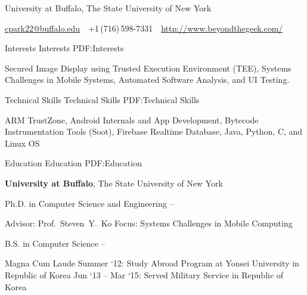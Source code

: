 \documentclass[letterpaper,MMMyyyy,nonstopmode]{simpleresumecv}
\newcommand{\CVAuthor}{Chang Min Park}
\newcommand{\CVWebpage}{http://www.beyondthegeek.com/}
\begin{document}

\Title{\CVAuthor}

\begin{SubTitle}
University at Buffalo, The State University of New York
\par
\href{mailto:cpark22@buffalo.edu}
{cpark22@buffalo.edu}
\,\SubBulletSymbol\,
+1\,(716)\,598-7331
\,\SubBulletSymbol\,
\href{\CVWebpage}
{\url{\CVWebpage}}
\end{SubTitle}

\begin{Body}

\Section
{Interests}
{Interests}
{PDF:Interests}

\Entry
Secured Image Display using Trusted Execution Environment (TEE), Systems Challenges in Mobile Systems, 
Automated Software Analysis, and UI Testing.

\vspace{-1ex}

\Section
{Technical Skills}
{Technical Skills}
{PDF:Technical Skills}

\Entry
ARM TrustZone, Android Internals and App Development, Bytecode Instrumentation Tools (Soot),
Firebase Realtime Database, Java, Python, C, and Linux OS
\BigGap

\vspace{-2ex}

\Section
{Education}
{Education}
{PDF:Education}

\Entry
\textbf{University at Buffalo}, The State University of New York

\Gap
\BulletItem
Ph.D. in Computer Science and Engineering
\hfill
{} --
\begin{Detail}
\SubBulletItem
Advisor:
Prof.~Steven~Y.~Ko
\SubBulletItem
Focus:
Systems Challenges in Mobile Computing
\end{Detail}

\Gap
\BulletItem
B.S. in Computer Science
\hfill
{} --
\begin{Detail}
\SubBulletItem
Magna Cum Laude
\SubBulletItem
Summer `12: Study Abroad Program at Yonsei University in Republic of Korea
\SubBulletItem
Jun `13 -- Mar `15: Served Military Service in Republic of Korea
\end{Detail}



\end{Body}
\end{document}
